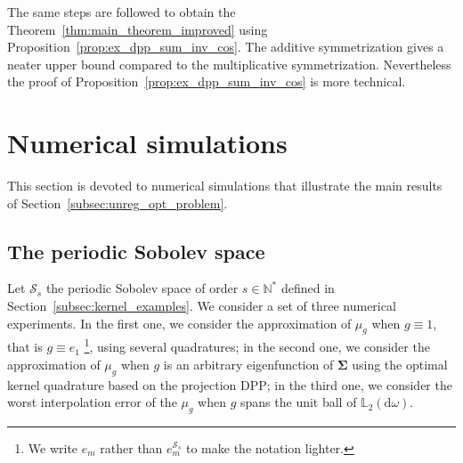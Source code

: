 \documentclass[twoside,11pt]{book}
\numberwithin{theorem}{chapter}
\numberwithin{definition}{chapter}
\numberwithin{proposition}{chapter}
\numberwithin{corollary}{chapter}
\numberwithin{example}{chapter}
\numberwithin{lemma}{chapter}
\numberwithin{assumption}{chapter}
\numberwithin{equation}{chapter}
\numberwithin{figure}{chapter}
\newcommand{\rb}[1]{\textcolor{magenta}{#1}}
\begin{document}
The same steps are followed to obtain the Theorem~\ref{thm:main_theorem_improved} using Proposition~\ref{prop:ex_dpp_sum_inv_cos}.
The additive symmetrization gives a neater upper bound compared to the multiplicative symmetrization. Nevertheless the proof of Proposition~\ref{prop:ex_dpp_sum_inv_cos} is more technical.



\section{Numerical simulations}\label{sec:num_sim_dppkq}
This section is devoted to numerical simulations that illustrate the main results of Section~\ref{subsec:unreg_opt_problem}.

\subsection{The periodic Sobolev space}\label{s:sobolev_numsim}
Let $\mathcal{S}_{s}$ the periodic Sobolev space of order $s \in \mathbb{N}^{*}$ defined in Section~\ref{subsec:kernel_examples}.
We consider a set of three numerical experiments. In the first one, we consider the approximation of $\mu_{g}$ when $g \equiv 1$, that is $g \equiv e_{1}$ \footnote{We write $e_{m}$ rather than $e^{\mathcal{S}_{s}}_{m}$ to make the notation lighter.}, using several quadratures; in the second one, we consider the approximation of $\mu_{g}$ when $g$ is an arbitrary eigenfunction of $\bm{\Sigma}$ using the optimal kernel quadrature based on the projection DPP; in the third one, we consider the worst interpolation error of the $\mu_g$ when $g$ spans the unit ball of $\mathbb{L}_{2}(\mathrm{d}\omega)$. 
\end{document}
